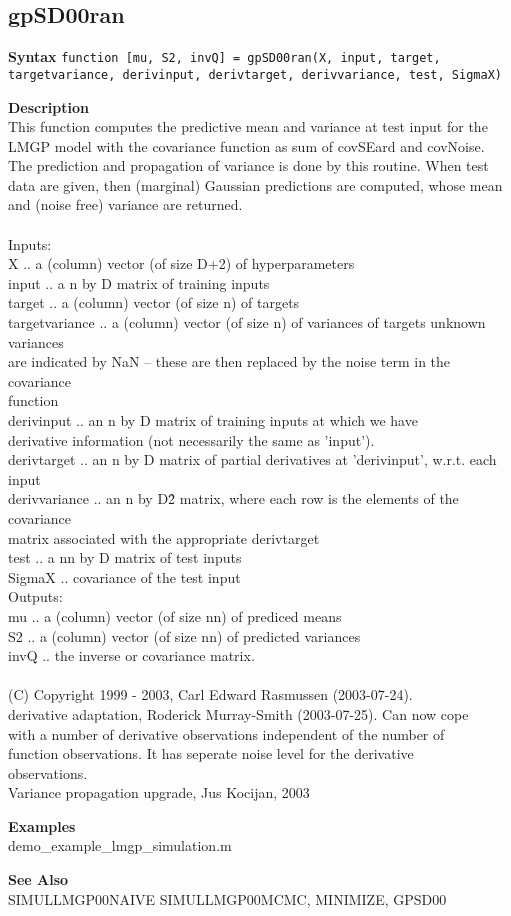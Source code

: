 \subsection*{gpSD00ran}  \label{fun:gpSD00ran}


\textbf{Syntax}
\texttt{function [mu, S2, invQ] = gpSD00ran(X, input, target, targetvariance, derivinput, derivtarget, derivvariance, test, SigmaX)}

\textbf{Description}
\\ This function computes the predictive mean and variance at test input for
 the LMGP model with the covariance function as sum of covSEard
and  covNoise.  The prediction and propagation of variance is done
by this
 routine. When test data are given, then (marginal) Gaussian
predictions  are computed, whose mean and (noise free) variance
are returned.
\\
\\ Inputs:
\\ X       ..  a (column) vector (of size D+2) of hyperparameters
\\ input   ..  a n by D matrix of training inputs
\\ target  ..  a (column) vector (of size n) of targets
\\ targetvariance  ..  a (column) vector (of size n) of variances of
 targets unknown variances
 \\ \tab are indicated by NaN -- these are then
   replaced by the noise term in the covariance
   \\ \tab  function
\\ derivinput  ..  an n by D matrix of training inputs at which we have
\\   derivative information (not necessarily the same as 'input').
\\ derivtarget  ..  an n by D matrix of partial derivatives at 'derivinput',
 w.r.t. each input
\\ derivvariance  ..  an n by D\^2 matrix, where each row is the elements of
 the covariance
 \\ \tab  matrix associated with the appropriate derivtarget
\\ test    ..  a nn by D matrix of test inputs
\\ SigmaX  ..  covariance of the test input
\\ Outputs:
\\ mu      ..  a (column) vector (of size nn) of prediced means
\\ S2      ..  a (column) vector (of size nn) of predicted variances
\\ invQ    ..  the inverse or covariance matrix.
\\
\\ (C) Copyright 1999 - 2003, Carl Edward Rasmussen (2003-07-24).
\\ derivative adaptation, Roderick Murray-Smith (2003-07-25). Can now cope
\\ with a number of derivative observations independent of the number of
\\ function observations. It has seperate noise level for the derivative
\\ observations.
\\ Variance propagation upgrade, Jus Kocijan, 2003

\textbf{Examples}
\\ demo\_example\_lmgp\_simulation.m

\textbf{See Also}
\\ SIMULLMGP00NAIVE SIMULLMGP00MCMC, MINIMIZE, GPSD00
